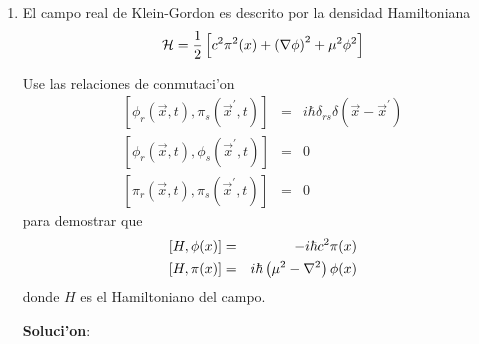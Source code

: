 \begin{enumerate}
\item El campo real de Klein-Gordon es descrito por la densidad Hamiltoniana
\begin{equation}
\mathcal{H}=\frac{1}{2}\left[ c^{2}\pi ^{2}(x) +\left( {\bf %
\nabla }\phi \right) ^{2}+\mu ^{2}\phi ^{2}\right]
\end{equation}

 Use las relaciones de conmutaci'on
\begin{eqnarray*}
\left[ \phi _{r}\left( \vec{x},t\right) ,\pi _{s}\left( \vec{x}%
^{\prime },t\right) \right] &=&i\hbar \delta _{rs}\delta \left( \vec{x}%
-\vec{x}^{\prime }\right) \\
\left[ \phi _{r}\left( \vec{x},t\right) ,\phi _{s}\left( \vec{x}%
^{\prime },t\right) \right] &=&0 \\
\left[ \pi _{r}\left( \vec{x},t\right) ,\pi _{s}\left( \vec{x}^{\prime
},t\right) \right] &=&0
\end{eqnarray*}
para demostrar que
\begin{eqnarray*}
\left[ H,\phi (x) \right] &=&-i\hbar c^{2}\pi (x) 
\\
\left[ H,\pi (x) \right] &=&i\hbar \left( \mu ^{2}-{\bf %
\nabla }^{2}\right) \phi (x) 
\end{eqnarray*}
donde $H$ es el Hamiltoniano del campo.

\textbf{Soluci'on}:


\end{enumerate}
